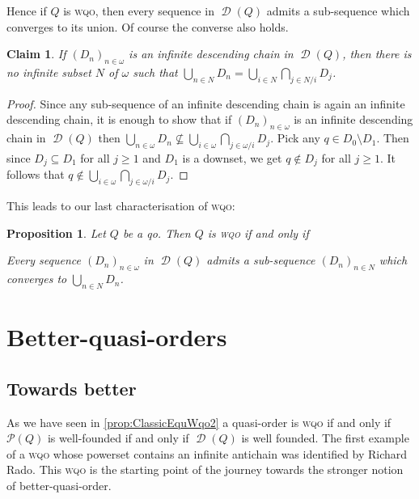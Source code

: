 \documentclass{article}%
\theoremstyle{plain}
\newtheorem{proposition}[theorem]{Proposition}
\newtheorem{lemma}[theorem]{Properties}
\newtheorem{lemma}[theorem]{Lemma}
\newtheorem{lemma}[theorem]{Fact}
\newtheorem{lemma}[theorem]{Facts}
\newtheorem{lemma}{Claim}
\theoremstyle{definition}
\theoremstyle{remark}
\newcommand{\wqo}{\textsc{wqo}}
\DeclareMathOperator{\Down}{\mathcal{D}} %
\begin{document}
Hence if $Q$ is \wqo{}, then every sequence in $\Down(Q)$ admits a sub-sequence which converges to its union. Of course the converse also holds.
 
\begin{lemma}
If $(D_{n})_{n\in\omega}$ is an infinite descending chain in $\Down(Q)$, then there is no infinite subset $N$ of $\omega$ such that $\bigcup_{n\in N} D_{n}=\bigcup_{i\in N}\bigcap_{j\in N/i}D_{j}$.
\end{lemma}
\begin{proof}
Since any sub-sequence of an infinite descending chain is again an infinite descending chain, it is enough to show that if $(D_{n})_{n\in\omega}$ is an infinite descending chain in $\Down(Q)$ then $\bigcup_{n\in \omega} D_{n} \nsubseteq \bigcup_{i\in \omega}\bigcap_{j\in \omega/i}D_{j}$. Pick any $q\in D_{0}\setminus D_{1}$. Then since $D_{j}\subseteq D_{1}$ for all $j\geq 1$ and $D_{1}$ is a downset, we get $q\notin D_{j}$ for all $j\geq 1$. It follows that $q\notin \bigcup_{i\in \omega}\bigcap_{j\in \omega/i}D_{j}$.
\end{proof}

This leads to our last characterisation of \wqo{}:
\begin{proposition}\label{prop WqoRado}
Let $Q$ be a qo. Then $Q$ is \wqo{} if and only if
\begin{enumWqo}[Wqo]
\item Every sequence $(D_{n})_{n\in\omega}$ in $\Down(Q)$ admits a sub-sequence $(D_{n})_{n\in N}$ which converges to $\bigcup_{n\in N}D_{n}$.
\end{enumWqo}
\end{proposition}


\section{Better-quasi-orders}\label{sec BQO}



\subsection{Towards better}\label{subsec TowardsBetter}

As we have seen in \cref{prop:ClassicEquWqo2} a quasi-order is \wqo{} if and only if $\mathcal{P}(Q)$ is well-founded if and only if $\Down(Q)$ is well founded. The first example of a \wqo{} whose powerset contains an infinite antichain was identified by Richard Rado. This \wqo{} is the starting point of the journey towards the stronger notion of better-quasi-order.
\end{document}
